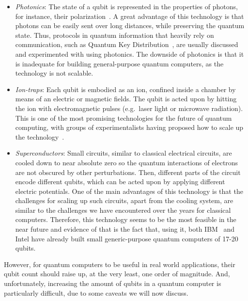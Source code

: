 \begin{itemize}

  \item \textit{Photonics}: The state of a qubit is represented in the properties of photons, for instance, their polarization~\cite{PolarizationQC}. A great advantage of this technology is that photons can be easily sent over long distances, while preserving the quantum state. Thus, protocols in quantum information that heavily rely on communication, such as Quantum Key Distribution~\cite{QKD}, are usually discussed and experimented with using photonics. The downside of photonics is that it is inadequate for building general-purpose quantum computers, as the technology is not scalable.

  \item \textit{Ion-traps}: Each qubit is embodied as an ion, confined inside a chamber by means of an electric or magnetic fields. The qubit is acted upon by hitting the ion with electromagnetic pulses (e.g.\ laser light or microwave radiation). This is one of the most promising technologies for the future of quantum computing, with groups of experimentalists having proposed how to scale up the technology~\cite{HensingerIonTraps}.

  \item \textit{Superconductors}: Small circuits, similar to classical electrical circuits, are cooled down to near absolute zero so the quantum interactions of electrons are not obscured by other perturbations. Then, different parts of the circuit encode different qubits, which can be acted upon by applying different electric potentials. One of the main advantages of this technology is that the challenges for scaling up such circuits, apart from the cooling system, are similar to the challenges we have encountered over the years for classical computers. Therefore, this technology seems to be the most feasible in the near future and evidence of that is the fact that, using it, both IBM~\cite{IBM_Superconductor} and Intel\cite{Intel_Superconductor} have already built small generic-purpose quantum computers of 17-20 qubits.

\end{itemize}

However, for quantum computers to be useful in real world applications, their qubit count should raise up, at the very least, one order of magnitude. And, unfortunately, increasing the amount of qubits in a quantum computer is particularly difficult, due to some caveats we will now discuss.


